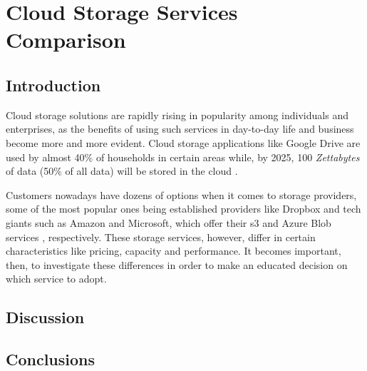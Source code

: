 \chapter{Cloud Storage Services Comparison}

\section{Introduction}
Cloud storage solutions are rapidly rising in popularity among individuals and enterprises, as the benefits of using such services in day-to-day life and business become more and more evident. Cloud storage applications like Google Drive are used by almost 40\% of households in certain areas while, by 2025, 100 \textit{Zettabytes} of data (50\% of all data) will be stored in the cloud \cite{zeta}. 

Customers nowadays have dozens of options when it comes to storage providers, some of the most popular ones being established providers like Dropbox \cite{dropbox} and tech giants such as Amazon and Microsoft, which offer their \ac{s3} and Azure Blob services \cite{s3,blob}, respectively. These storage services, however, differ in certain characteristics like pricing, capacity and performance. It becomes important, then, to investigate these differences in order to make an educated decision on which service to adopt.


\section{Discussion}

\section{Conclusions}